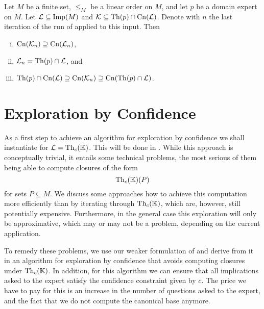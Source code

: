 \begin{Theorem}
  \label{thm:explore-implications-weaker-version-all-other-properties}
  Let $M$ be a finite set, $\leq_{M}$ be a linear order on $M$, and let $p$ be a domain
  expert on $M$.  Let $\mathcal{L} \subseteq \operatorname{Imp}(M)$ and $\mathcal{K} \subseteq \operatorname{Th}(p)
  \cap \operatorname{Cn}(\mathcal{L})$.  Denote with $n$ the last iteration of the run of
   applied to this input.  Then
  \begin{enumerate}[i. ]
  \item $\operatorname{Cn}(\mathcal{K}_{n}) \supseteq \operatorname{Cn}(\mathcal{L}_{n})$,
  \item $\mathcal{L}_{n} = \operatorname{Th}(p) \cap \mathcal{L}$, and
  \item $\operatorname{Th}(p) \cap \operatorname{Cn}(\mathcal{L}) \supseteq \operatorname{Cn}(\mathcal{K}_{n}) \supseteq \operatorname{Cn}(\operatorname{Th}(p) \cap \mathcal{L})$.
  \end{enumerate}
\end{Theorem}

\section{Exploration by Confidence}
\label{sec:expl-conf}

As a first step to achieve an algorithm for exploration by confidence we shall instantiate
 for $\mathcal{L} = \operatorname{Th}_{c}({\mathbb{K}})$.  This will be done in
.  While this approach is conceptually trivial, it entails some
technical problems, the most serious of them being able to compute closures of the form
\begin{equation*}
  \operatorname{Th}_{c}({\mathbb{K}})(P)
\end{equation*}
for sets $P \subseteq M$.  We discuss some approaches how to achieve this computation more
efficiently than by iterating through $\operatorname{Th}_{c}({\mathbb{K}})$, which are, however, still
potentially expensive.  Furthermore, in the general case this exploration will only be
approximative, which may or may not be a problem, depending on the current application.

To remedy these problems, we use our weaker formulation of
 and derive from it in
 an algorithm for exploration by confidence that avoids computing
closures under $\operatorname{Th}_{c}({\mathbb{K}})$.  In addition, for this algorithm we can ensure that all
implications asked to the expert satisfy the confidence constraint given by $c$.  The
price we have to pay for this is an increase in the number of questions asked to the
expert, and the fact that we do not compute the canonical base anymore.

